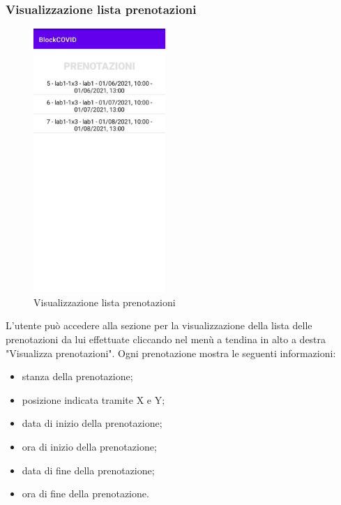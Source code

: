 	\subsubsection{Visualizzazione lista prenotazioni}
	\begin{figure}[H]
		\centering
		\includegraphics[width=5cm]{res/images/VisualizzaPrenotazioni.png}
		\caption{Visualizzazione lista prenotazioni}
	\end{figure}
	L’utente può accedere alla sezione per la visualizzazione della lista delle prenotazioni da lui effettuate cliccando nel menù a tendina in alto a destra "Visualizza prenotazioni".
	Ogni prenotazione mostra le seguenti informazioni:
	\begin{itemize}
		\item stanza della prenotazione;
		\item posizione indicata tramite X e Y;
		\item data di inizio della prenotazione;
		\item ora di inizio della prenotazione;
		\item data di fine della prenotazione;
		\item ora di fine della prenotazione.
	\end{itemize}
